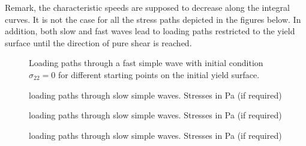 Remark, the characteristic speeds are supposed to decrease along the integral curves. It is not the case for all the stress paths depicted in the figures below. In addition, both slow and fast waves lead to loading paths restricted to the yield surface until the direction of pure shear is reached.
\begin{figure}[h!]
  \centering
  \caption{Loading paths through a fast simple wave with initial condition $\sigma_{22}=0$ for different starting points on the initial yield surface.}
  \label{fig:fast_path_plane_strains}
\end{figure}


\begin{figure}[h!]
  \centering
  \caption{loading paths through slow simple waves. Stresses in Pa (if required)}
  \label{fig:slow_path_plane_strains}
\end{figure}

\begin{figure}[h!]
  \centering
  \caption{loading paths through slow simple waves. Stresses in Pa (if required)}
  \label{fig:slow_path_plane_strains}
\end{figure}


\begin{figure}[h!]
  \centering
  \caption{loading paths through slow simple waves. Stresses in Pa (if required)}
  \label{fig:slow_path_plane_strains}
\end{figure}


